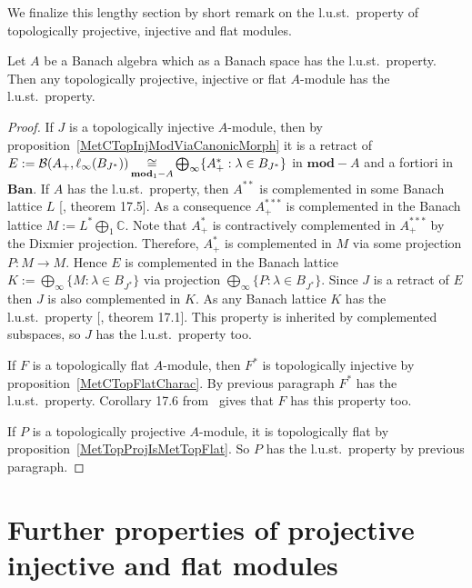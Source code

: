 We finalize this lengthy section by short remark on the l.u.st.\ property of
topologically projective, injective and flat modules. 

\begin{proposition} Let $A$ be a Banach algebra which as a Banach space has the
l.u.st.\ property. Then any topologically projective, injective or flat
$A$-module has the l.u.st.\ property.
\end{proposition}
\begin{proof} 

If $J$ is a topologically injective $A$-module, then by
proposition~\ref{MetCTopInjModViaCanonicMorph} it is a retract of
$E:=\mathcal{B}(A_+,\ell_\infty(B_{J^*}))
\mathop{\mathbin{\cong}}\limits_{\mathbf{mod}_1-A}
\bigoplus_\infty \{ A_+^*:\lambda\in B_{J^*} \}$ 
in $\mathbf{mod}-A$ and a fortiori in $\mathbf{Ban}$. If $A$ has 
the l.u.st.\ property, then $A^{**}$ is complemented
in some Banach lattice $L$ [\cite{DiestAbsSumOps}, theorem 17.5]. As a
consequence $A_+^{***}$ is complemented in the Banach lattice
$M:=L^*\bigoplus_1\mathbb{C}$. Note that $A_+^*$ is contractively
complemented in $A_+^{***}$ by the Dixmier projection. Therefore, $A_+^*$ is 
complemented in $M$ via some projection $P:M\to M$. Hence $E$ is
complemented in the Banach lattice $K:=\bigoplus_\infty \{M:\lambda\in B_{J^*} \}$
via projection $\bigoplus_\infty \{P:\lambda\in B_{J^*} \}$. Since $J$ is a retract of
$E$ then $J$ is also complemented in $K$. As any Banach lattice $K$ has the l.u.st.\ 
property [\cite{DiestAbsSumOps}, theorem 17.1]. This property is inherited 
by complemented subspaces, so $J$ has the l.u.st.\ property too.

If $F$ is a topologically flat $A$-module, then $F^*$ is topologically injective
by proposition~\ref{MetCTopFlatCharac}. By previous paragraph $F^*$ has the
l.u.st.\ property. Corollary 17.6 from~\cite{DiestAbsSumOps} gives that $F$ has
this property too.

If $P$ is a topologically projective $A$-module, it is topologically flat by
proposition~\ref{MetTopProjIsMetTopFlat}. So $P$ has the l.u.st.\ property by
previous paragraph.
\end{proof}


\section{
    Further properties of projective injective and flat modules}\label{
SectionFurtherPropertiesOfProjectiveInjectiveAndFlatModules}

